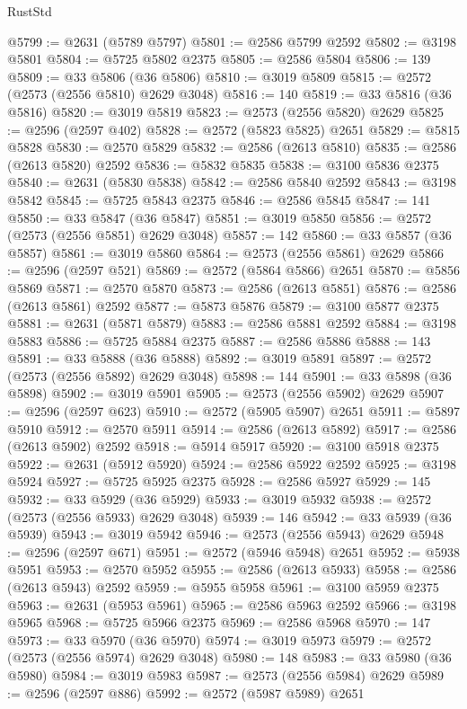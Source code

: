 \begin{lexlean}{RustStd}
\begin{coremodule}
@5799 := @2631 (@5789 @5797)
@5801 := @2586 @5799 @2592
@5802 := @3198 @5801
@5804 := @5725 @5802 @2375
@5805 := @2586 @5804
@5806 := 139
@5809 := @33 @5806 (@36 @5806)
@5810 := @3019 @5809
@5815 := @2572 (@2573 (@2556 @5810) @2629 @3048)
@5816 := 140
@5819 := @33 @5816 (@36 @5816)
@5820 := @3019 @5819
@5823 := @2573 (@2556 @5820) @2629
@5825 := @2596 (@2597 @402)
@5828 := @2572 (@5823 @5825) @2651
@5829 := @5815 @5828
@5830 := @2570 @5829
@5832 := @2586 (@2613 @5810)
@5835 := @2586 (@2613 @5820) @2592
@5836 := @5832 @5835
@5838 := @3100 @5836 @2375
@5840 := @2631 (@5830 @5838)
@5842 := @2586 @5840 @2592
@5843 := @3198 @5842
@5845 := @5725 @5843 @2375
@5846 := @2586 @5845
@5847 := 141
@5850 := @33 @5847 (@36 @5847)
@5851 := @3019 @5850
@5856 := @2572 (@2573 (@2556 @5851) @2629 @3048)
@5857 := 142
@5860 := @33 @5857 (@36 @5857)
@5861 := @3019 @5860
@5864 := @2573 (@2556 @5861) @2629
@5866 := @2596 (@2597 @521)
@5869 := @2572 (@5864 @5866) @2651
@5870 := @5856 @5869
@5871 := @2570 @5870
@5873 := @2586 (@2613 @5851)
@5876 := @2586 (@2613 @5861) @2592
@5877 := @5873 @5876
@5879 := @3100 @5877 @2375
@5881 := @2631 (@5871 @5879)
@5883 := @2586 @5881 @2592
@5884 := @3198 @5883
@5886 := @5725 @5884 @2375
@5887 := @2586 @5886
@5888 := 143
@5891 := @33 @5888 (@36 @5888)
@5892 := @3019 @5891
@5897 := @2572 (@2573 (@2556 @5892) @2629 @3048)
@5898 := 144
@5901 := @33 @5898 (@36 @5898)
@5902 := @3019 @5901
@5905 := @2573 (@2556 @5902) @2629
@5907 := @2596 (@2597 @623)
@5910 := @2572 (@5905 @5907) @2651
@5911 := @5897 @5910
@5912 := @2570 @5911
@5914 := @2586 (@2613 @5892)
@5917 := @2586 (@2613 @5902) @2592
@5918 := @5914 @5917
@5920 := @3100 @5918 @2375
@5922 := @2631 (@5912 @5920)
@5924 := @2586 @5922 @2592
@5925 := @3198 @5924
@5927 := @5725 @5925 @2375
@5928 := @2586 @5927
@5929 := 145
@5932 := @33 @5929 (@36 @5929)
@5933 := @3019 @5932
@5938 := @2572 (@2573 (@2556 @5933) @2629 @3048)
@5939 := 146
@5942 := @33 @5939 (@36 @5939)
@5943 := @3019 @5942
@5946 := @2573 (@2556 @5943) @2629
@5948 := @2596 (@2597 @671)
@5951 := @2572 (@5946 @5948) @2651
@5952 := @5938 @5951
@5953 := @2570 @5952
@5955 := @2586 (@2613 @5933)
@5958 := @2586 (@2613 @5943) @2592
@5959 := @5955 @5958
@5961 := @3100 @5959 @2375
@5963 := @2631 (@5953 @5961)
@5965 := @2586 @5963 @2592
@5966 := @3198 @5965
@5968 := @5725 @5966 @2375
@5969 := @2586 @5968
@5970 := 147
@5973 := @33 @5970 (@36 @5970)
@5974 := @3019 @5973
@5979 := @2572 (@2573 (@2556 @5974) @2629 @3048)
@5980 := 148
@5983 := @33 @5980 (@36 @5980)
@5984 := @3019 @5983
@5987 := @2573 (@2556 @5984) @2629
@5989 := @2596 (@2597 @886)
@5992 := @2572 (@5987 @5989) @2651

\end{coremodule}
\end{lexlean}
